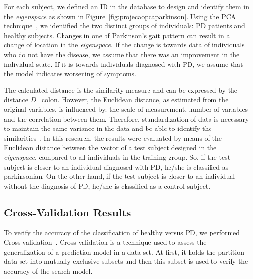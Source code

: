 \documentclass[10pt, conference, compsocconf]{IEEEtran}
\begin{document}
%


For each subject, we defined an ID in the database to design and identify them in the \textit{eigenspace} as shown in Figure~\ref{fig:projecaopcaparkinson}. Using the PCA technique~\cite{Shlens05atutorial}, we identified the two distinct groups of individuals: PD patients and healthy subjects. Changes in one of Parkinson's gait pattern can result in a change of location in the \textit{eigenspace}. If the change is towards data of individuals who do not have the disease, we assume that there was an improvement in the individual state. If it is towards individuals diagnosed with PD, we assume that the model indicates worsening of symptoms.





The calculated distance is the similarity measure and can be expressed by the distance $ D $ \ colon. However, the Euclidean distance, as estimated from the original variables, is influenced by: the scale of measurement, number of variables and the correlation between them. Therefore, standardization of data is necessary to maintain the same variance in the data and be able to identify the similarities~\cite{dillmann2014}. In this research, the results were evaluated by means of the Euclidean distance between the vector of a test subject designed in the \textit{eigenspace}, compared to all individuals in the training group. So, if the test subject is closer to an individual diagnosed with PD, he/she is classified as parkinsonian. On the other hand, if the test subject is closer to an individual without the diagnosis of PD, he/she is classified as a control subject.




\subsection{Cross-Validation Results}
To verify the accuracy of the classification of healthy versus PD, we performed Cross-validation~\cite{datamining2005}. Cross-validation is a technique used to assess the generalization of a prediction model in a data set. At first, it holds the partition data set into mutually exclusive subsets and then this subset is used to verify the accuracy of the search model.
\end{document}

